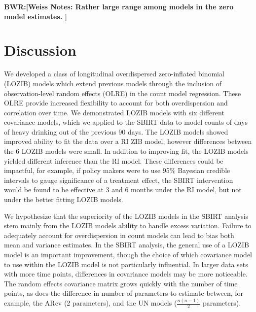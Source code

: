 \documentclass[12pt]{article}
\def\bwr#1{{\color{violet}\textbf{BWR:[#1]}}}
\begin{document}


\bwr{Weiss Notes: Rather large range among models in the zero model estimates. }

\section{Discussion}

We developed a class of longitudinal overdispersed zero-inflated binomial (LOZIB) models which extend previous models through the inclusion of observation-level random effects (OLRE) in the count model regression. These OLRE provide increased flexibility to account for both overdispersion and correlation over time. We demonstrated LOZIB models with six different covariance models, which we applied to the SBIRT data to model counts of days of heavy drinking out of the previous 90 days. The LOZIB models showed improved ability to fit the data over a RI ZIB model, however differences between the 6 LOZIB models were small. In addition to improving fit, the LOZIB models yielded different inference than the RI model. These differences could be impactful, for example, if policy makers were to use 95\% Bayesian credible intervals to gauge significance of a treatment effect, the SBIRT intervention would be found to be effective at 3 and 6 months under the RI model, but not under the better fitting LOZIB models. 

We hypothesize that the superiority of the LOZIB models in the SBIRT analysis stem mainly from the LOZIB models ability to handle excess variation. Failure to adequately account for overdispersion in count models can lead to bias both mean and variance estimates. In the SBIRT analysis, the general use of a LOZIB model is an important improvement, though the choice of which covariance model to use within the LOZIB model is not particularly influential. In larger data sets with more time points, differences in covariance models may be more noticeable. The random effects covariance matrix grows quickly with the number of time points, as does the difference in number of parameters to estimate between, for example, the ARcv (2 parameters), and the UN models ($\frac{n (n-1)}{2}$ parameters).  
\end{document}
